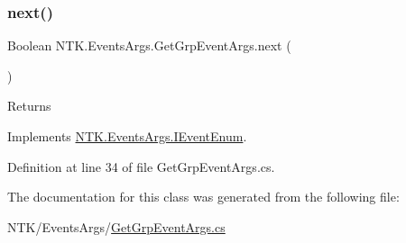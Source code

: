 \subsubsection{\texorpdfstring{next()}{next()}}
{\footnotesize\ttfamily Boolean N\+T\+K.\+Events\+Args.\+Get\+Grp\+Event\+Args.\+next (\begin{DoxyParamCaption}{ }\end{DoxyParamCaption})}





\begin{DoxyReturn}{Returns}

\end{DoxyReturn}


Implements \mbox{\hyperlink{interface_n_t_k_1_1_events_args_1_1_i_event_enum_a2b8c40d6d7e9899659aa5a469da93586}{N\+T\+K.\+Events\+Args.\+I\+Event\+Enum}}.



Definition at line 34 of file Get\+Grp\+Event\+Args.\+cs.



The documentation for this class was generated from the following file\+:\begin{DoxyCompactItemize}
\item 
N\+T\+K/\+Events\+Args/\mbox{\hyperlink{_get_grp_event_args_8cs}{Get\+Grp\+Event\+Args.\+cs}}\end{DoxyCompactItemize}
